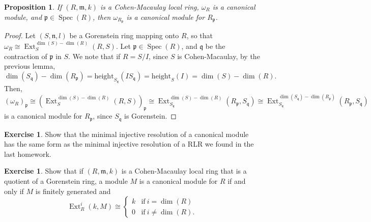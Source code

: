\documentclass[11pt]{book}
\newtheorem{proposition}[theorem]{Proposition}
\numberwithin{equation}{section}
\numberwithin{theorem}{chapter}
\theoremstyle{definition}
\newtheorem{exercise}[theorem]{Exercise}
\newtheorem*{basic properties}{Basic Properties}
\newtheorem*{Important Remark}{Important Remark}
\theoremstyle{remark}
\newcommand{\m}{\mathfrak{m}}
\newcommand{\n}{\mathfrak{n}}
\newcommand{\p}{\mathfrak{p}}
\newcommand{\q}{\mathfrak{q}}
\newcommand{\Spec}{\operatorname{Spec}}
\newcommand{\Ext}{\operatorname{Ext}}
\renewcommand{\dim}{\operatorname{dim}}
\begin{document}
\begin{proposition}
	If $(R,\m,k)$ is a Cohen-Macaulay local ring, $\omega_R$ is a canonical module, and $\p \in \Spec(R)$, then $\omega_{R_\p}$ is a canonical module for $R_\p$.
\end{proposition}
\begin{proof}
	Let $(S,\n,l)$ be a Gorenstein ring mapping onto $R$, so that $\omega_R\cong \Ext^{\dim(S)-\dim(R)}_S(R,S)$. Let $\p\in \Spec(R)$, and $\q$ be the contraction of $\p$ in $S$. We note that if $R=S/I$, since $S$ is Cohen-Macaulay, by the previous lemma,
	\[\dim(S_\q) - \dim(R_\p) = \mathrm{height}_{S_\q}(I S_\q) = \mathrm{height}_{S}(I) = \dim(S) - \dim(R). \]
	Then, 
	\[(\omega_R)_{\p} \cong (\Ext^{\dim(S)-\dim(R)}_S(R,S))_\p \cong \Ext^{\dim(S)-\dim(R)}_{S_\q}(R_\p,S_\q)\cong \Ext^{\dim(S_\q)-\dim(R_\p)}_{S_\q}(R_\p,S_\q) \]
	is a canonical module for $R_\p$, since $S_\q$ is Gorenstein.
\end{proof}

\begin{exercise}
	Show that the minimal injective resolution of a canonical module has the same form as the minimal injective resolution of a RLR we found in the last homework.
\end{exercise}

\begin{exercise}
	Show that if $(R,\m,k)$ is a Cohen-Macaulay local ring that is a quotient of a Gorenstein ring, a module $M$ is a canonical module for $R$ if and only if $M$ is finitely generated and
	\[\Ext^i_R(k,M)\cong\begin{cases} k & \text{if} \ i=\dim(R) \\ 0 & \text{if} \ i\neq\dim(R). \end{cases}\]
\end{exercise}
\end{document}
